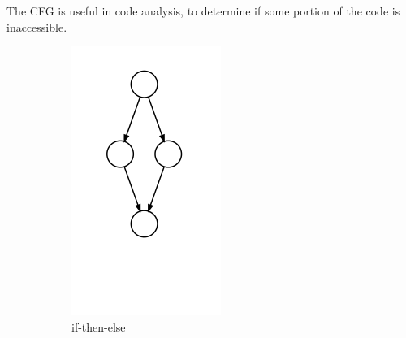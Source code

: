 The CFG is useful in code analysis, to determine if some portion of the code is inaccessible.

\begin{figure}[h]
	\centering
	\begin{subfigure}[t]{.24\textwidth}
		\centering
		\includegraphics[width=\linewidth]{cfga.png}
		\caption{if-then-else}\label{fig:cfga}		
	\end{subfigure}
	\begin{subfigure}[t]{.24\textwidth}

\end{subfigure}
\end{figure}
